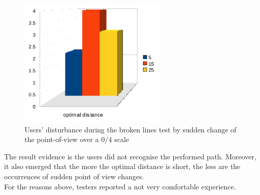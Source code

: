\begin{figure}[!h]
  \begin{center}
    \includegraphics[width=200pt]{img/zz_results.png}
    \caption{Users' disturbance during the broken lines test 
      by sudden change of the point-of-view over a 0/4 scale}
  \end{center}
\end{figure}

The result evidence is the users did not recognise the performed path.
Moreover, it also emerged that the more the optimal distance is short,
the less are the occurrences of sudden point of view changes.
\\
For the reasons above, testers reported a not very comfortable experience.
